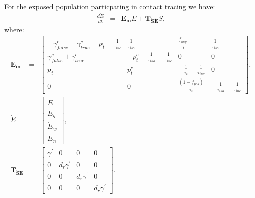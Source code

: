 \documentclass{article}
\begin{document}
For the exposed population particpating in contact tracing we have:
\begin{eqnarray}
\frac{d\dot{E}}{dt} &=& \boldsymbol{\dot{E}_{m}}  \dot{E} + \boldsymbol{\dot{T}_{\dot{S}\dot{E}}}  \dot{S}, 
\end{eqnarray}
where:
\begin{eqnarray}
\boldsymbol{\dot{E}_{m}} &=&
\begin{bmatrix}
 -\gamma^{c}_{false} -\gamma^{c}_{true} - p_{t} -\frac{1}{\tau_{inc}} & \frac{1}{\tau_{iso}}  & \frac{f_{neg}}{\tau_{t}} & \frac{1}{\tau_{iso}} \\
\gamma^{c}_{false} + \gamma^{c}_{true}    &  -p^{c}_{t}  - \frac{1}{\tau_{iso}} - \frac{1}{\tau_{inc}}      &  0    & 0  \\
p_{t}     &  p^{c}_{t}                  &  -\frac{1}{\tau_{t}}  - \frac{1}{\tau_{inc}}  & 0 \\
0 & 0 & \frac{(1-f_{pos})}{\tau_{t}}  & -\frac{1}{\tau_{iso}}  -  \frac{1}{\tau_{inc}} 
\end{bmatrix}, \\ 
%
\dot{E} &=& 
\begin{bmatrix}
\dot{E} \\ \dot{E}_{q} \\ \dot{E}_{w}\\ \dot{E_{n}}
\end{bmatrix}, \\ 
%
\boldsymbol{\dot{T}_{\dot{S}\dot{E}}} &=&
\begin{bmatrix}
\gamma^{'}  & 0                 & 0                 & 0 \\ 
 0          & d_{r} \gamma^{'}  & 0                 & 0 \\ 
 0          & 0                 & d_{r} \gamma^{'}  & 0  \\
 0          & 0                 & 0                 & d_{r} \gamma^{'}
\end{bmatrix}.
\end{eqnarray}

\end{document}
